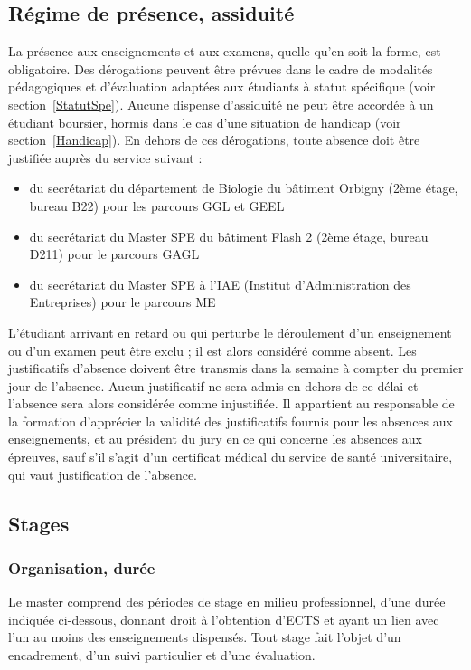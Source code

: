 \documentclass[a4paper,11pt]{article}
\begin{document}
\subsection{Régime de présence, assiduité}
La présence aux enseignements et aux examens, quelle qu'en soit la forme, est obligatoire.
Des dérogations peuvent être prévues dans le cadre de modalités pédagogiques et d'évaluation adaptées aux étudiants à statut spécifique (voir section~\ref{StatutSpe}). Aucune dispense d'assiduité ne peut être accordée à un étudiant boursier, hormis dans le cas d'une situation de handicap (voir section~\ref{Handicap}).
En dehors de ces dérogations, toute absence doit être justifiée auprès du service suivant :
\begin{itemize}
\item du secrétariat du département de Biologie du bâtiment Orbigny (2ème étage, bureau B22) pour les parcours GGL et GEEL
\item du secrétariat du Master SPE du bâtiment Flash 2 (2ème étage, bureau D211) pour le parcours GAGL
\item du secrétariat du Master SPE à l'IAE (Institut d'Administration des Entreprises) pour le parcours ME
\end{itemize}

L'étudiant arrivant en retard ou qui perturbe le déroulement d'un enseignement ou d'un examen peut être exclu ; il est alors considéré comme absent.
Les justificatifs d'absence doivent être transmis dans la semaine à compter du premier jour de l'absence. Aucun justificatif ne sera admis en dehors de ce délai et l'absence sera alors considérée comme injustifiée.
Il appartient au responsable de la formation d'apprécier la validité des justificatifs fournis pour les absences aux enseignements, et au président du jury en ce qui concerne les absences aux épreuves, sauf s'il s'agit d'un certificat médical du service de santé universitaire, qui vaut justification de l'absence.

\subsection{Stages}
\subsubsection{Organisation, durée}
Le master comprend des périodes de stage en milieu professionnel, d'une durée indiquée ci-dessous, donnant droit à l'obtention d'ECTS et ayant un lien avec l'un au moins des enseignements dispensés. Tout stage fait l'objet d'un encadrement, d'un suivi particulier et d'une évaluation.
\end{document}
